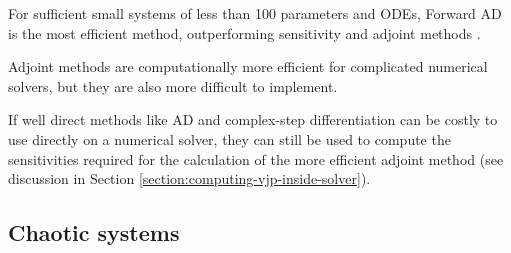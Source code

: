 For sufficient small systems of less than 100 parameters and ODEs, Forward AD is the most efficient method, outperforming sensitivity and adjoint methods \cite{ma_comparison_2021}.

Adjoint methods are computationally more efficient for complicated numerical solvers, but they are also more difficult to implement.

If well direct methods like AD and complex-step differentiation can be costly to use directly on a numerical solver, they can still be used to compute the sensitivities required for the calculation of the more efficient adjoint method (see discussion in Section \ref{section:computing-vjp-inside-solver}). 


\subsection{Chaotic systems}

